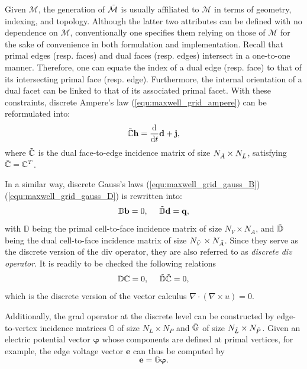 \documentclass{report}
\begin{document}
Given $\mathcal{M}$, the generation of $\Tilde{\mathcal{M}}$ is usually affiliated to $\mathcal{M}$ in terms of geometry, indexing, and topology. Although the latter two attributes can be defined with no dependence on $\mathcal{M}$, conventionally one specifies them relying on those of $\mathcal{M}$ for the sake of convenience in both formulation and implementation. Recall that primal edges (resp. faces) and dual faces (resp. edges) intersect in a one-to-one manner. Therefore, one can equate the index of a dual edge (resp. face) to that of its intersecting primal face (resp. edge). Furthermore, the internal orientation of a dual facet can be linked to that of its associated primal facet. With these constraints, discrete Ampere's law (\ref{equ:maxwell_grid_ampere}) can be reformulated into:
\begin{equation*}
    \Tilde{\mathbb{C}}\mathbf{h} = \frac{\text{d}}{\text{d}t} \mathbf{d} + \mathbf{j},
\end{equation*}
where $\Tilde{\mathbb{C}}$ is the dual face-to-edge incidence matrix of size $N_{\Tilde{A}} \times N_{\Tilde{L}}$, satisfying $\Tilde{\mathbb{C}} = \mathbb{C}^T$. 

In a similar way, discrete Gauss's laws (\ref{equ:maxwell_grid_gauss_B})(\ref{equ:maxwell_grid_gauss_D}) is rewritten into:
\begin{equation*}
    \mathbb{D}\mathbf{b} = 0, \ \ \ \  \Tilde{\mathbb{D}}\mathbf{d} = \mathbf{q},
\end{equation*}
with $\mathbb{D}$ being the primal cell-to-face incidence matrix of size $N_{V} \times N_{A}$, and $\Tilde{\mathbb{D}}$ being the dual cell-to-face incidence matrix of size $N_{\Tilde{V}} \times N_{\Tilde{A}}$. Since they serve as the discrete version of the div operator, they are also referred to as \emph{discrete div operator}. It is readily to be checked the following relations 
\begin{equation*}
    \mathbb{D}\mathbb{C} = 0, \ \ \ \ \Tilde{\mathbb{D}}\Tilde{\mathbb{C}} = 0,
\end{equation*}
which is the discrete version of the vector calculus $\nabla \cdot (\nabla \times u) = 0$.

Additionally, the grad operator at the discrete level can be constructed by edge-to-vertex incidence matrices $\mathbb{G}$ of size $N_L \times N_P$ and $\Tilde{\mathbb{G}}$ of size $N_{\Tilde{L}} \times N_{\Tilde{P}}$. Given an electric potential vector $\bm{\varphi}$ whose components are defined at primal vertices, for example, the edge voltage vector $\mathbf{e}$ can thus be computed by
\begin{equation*}
    \mathbf{e} = \mathbb{G}\bm{\varphi}.
\end{equation*}
\end{document}
